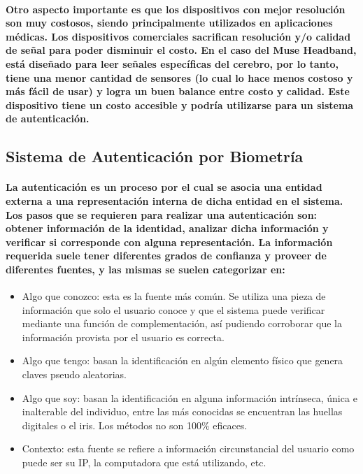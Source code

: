 \documentclass{article}
\begin{document}
\paragraph{
Otro aspecto importante es que los dispositivos con mejor resolución son muy costosos, siendo principalmente utilizados en aplicaciones médicas. Los dispositivos comerciales sacrifican resolución y/o calidad de señal para poder disminuir el costo. En el caso del Muse Headband, está diseñado para leer señales específicas del cerebro, por lo tanto, tiene una menor cantidad de sensores (lo cual lo hace menos costoso y más fácil de usar) y logra un buen balance entre costo y calidad. Este dispositivo tiene un costo accesible y podría utilizarse para un sistema de autenticación.
}
\subsection{Sistema de Autenticación por Biometría}
\paragraph{
La autenticación es un proceso por el cual se asocia una entidad externa a una representación interna de dicha entidad en el sistema. Los pasos que se requieren para realizar una autenticación son: obtener información de la identidad, analizar dicha información y verificar si corresponde con alguna representación. La información requerida suele tener diferentes grados de confianza y proveer de diferentes fuentes, y las mismas se suelen categorizar en:
}
\begin{itemize}
  \item Algo que conozco: esta es la fuente más común. Se utiliza una pieza de información que solo el usuario conoce y que el sistema puede verificar mediante una función de complementación, así pudiendo corroborar que la información provista por el usuario es correcta.
  \item Algo que tengo: basan la identificación en algún elemento físico que genera claves pseudo aleatorias.
  \item Algo que soy: basan la identificación en alguna información intrínseca, única e inalterable del individuo, entre las más conocidas se encuentran las huellas digitales o el iris. Los métodos no son 100\% eficaces.
  \item Contexto: esta fuente se refiere a información circunstancial del usuario como puede ser su IP, la computadora que está utilizando, etc.
\end{itemize}
\end{document}
